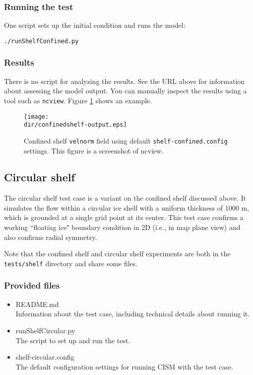 \subsubsection{Running the test}
One script sets up the initial condition and runs the model:

\texttt{./runShelfConfined.py}

\subsubsection{Results}
There is no script for analyzing the results.  See the URL above for information 
about assessing the model output.
You can manually inspect the results using a tool such as \texttt{ncview}.
Figure \ref{fig:confinedshelf-results} shows an example.

\begin{figure}[H]
	\centering
	\texttt{[image: \\dir/confinedshelf-output.eps]}
	\caption{Confined shelf \texttt{velnorm} field using default \texttt{shelf-confined.config} settings. This figure is a screenshot of ncview.}
	\label{fig:confinedshelf-results}
\end{figure}
\FloatBarrier

\subsection{Circular shelf}
The circular shelf test case is a variant on the confined shelf discussed above. It simulates the flow within a circular ice shelf with a uniform thickness
of 1000 m, which is grounded at a single grid point at its center. This test case confirms a working ``floating ice" boundary condition
in 2D (i.e., in map plane view) and also confirms radial symmetry. 

Note that the confined shelf and circular shelf experiments are both in the 
\texttt{tests/shelf} directory and share some files.

\subsubsection{Provided files}

\begin{itemize}
	\item README.md \\
		Information about the test case, including technical details about running it.
	\item runShelfCircular.py \\
		The script to set up and run the test.
	\item shelf-circular.config \\
          The default configuration settings for running CISM with the test case.
\end{itemize}

